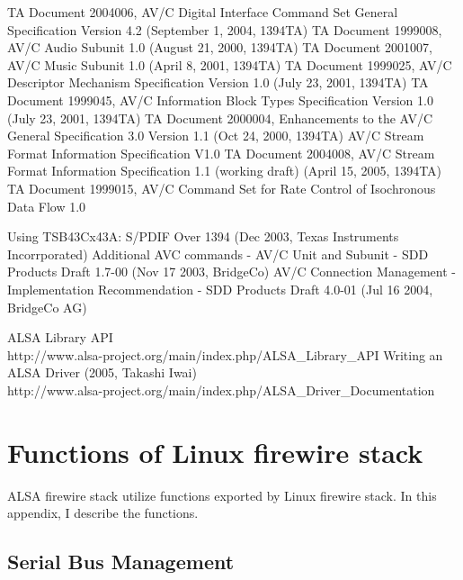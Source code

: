 \documentclass[onecolumn]{article}
\begin{document}
\begin{thebibliography}{99}
TA Document 2004006, AV/C Digital Interface Command Set General Specification Version 4.2 (September 1, 2004, 1394TA)
TA Document 1999008, AV/C Audio Subunit 1.0 (August 21, 2000, 1394TA)
TA Document 2001007, AV/C Music Subunit 1.0 (April 8, 2001, 1394TA)
TA Document 1999025, AV/C Descriptor Mechanism Specification Version 1.0 (July 23, 2001, 1394TA)
TA Document 1999045, AV/C Information Block Types Specification Version 1.0 (July 23, 2001, 1394TA)
TA Document 2000004, Enhancements to the AV/C General Specification 3.0 Version 1.1 (Oct 24, 2000, 1394TA)
AV/C Stream Format Information Specification V1.0
TA Document 2004008, AV/C Stream Format Information Specification 1.1 (working draft) (April 15, 2005, 1394TA)
TA Document 1999015, AV/C Command Set for Rate Control of Isochronous Data Flow 1.0

Using TSB43Cx43A: S/PDIF Over 1394 (Dec 2003, Texas Instruments Incorrporated)
Additional AVC commands - AV/C Unit and Subunit - SDD Products Draft 1.7-00 (Nov 17 2003, BridgeCo)
AV/C Connection Management - Implementation Recommendation - SDD Products Draft 4.0-01 (Jul 16 2004, BridgeCo AG)

ALSA Library API \\
http://www.alsa-project.org/main/index.php/ALSA\_Library\_API
Writing an ALSA Driver (2005, Takashi Iwai) \\
http://www.alsa-project.org/main/index.php/ALSA\_Driver\_Documentation

\end{thebibliography}

\newpage

\appendix

\section{Functions of Linux firewire stack}

ALSA firewire stack utilize functions exported by Linux firewire stack. In this appendix, I describe the functions.

\subsection{Serial Bus Management}
\end{document}
